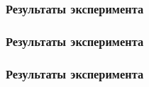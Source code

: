 \documentclass{beamer}
\begin{document}
\begin{frame}
\frametitle{Результаты эксперимента}
    \begin{figure}[h]
    \end{figure}
\end{frame}

\begin{frame}
\frametitle{Результаты эксперимента}
    \begin{figure}[h]
    \end{figure}
\end{frame}

\begin{frame}
\frametitle{Результаты эксперимента}
    \begin{figure}[h]
    \end{figure}
\end{frame}
\end{document}
